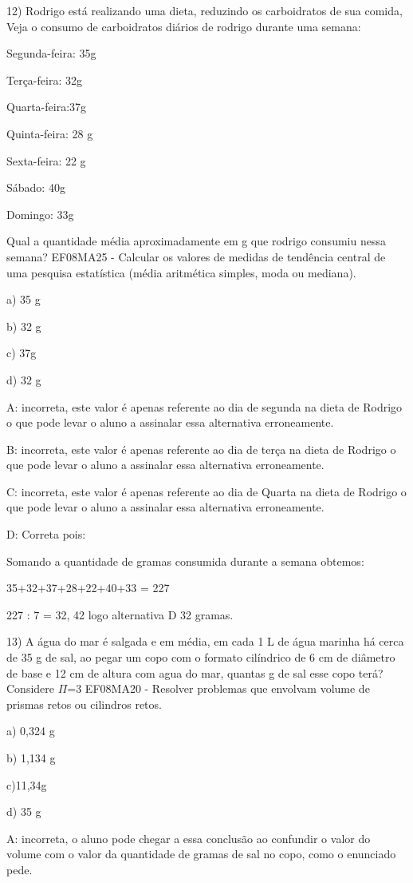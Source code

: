 {12) Rodrigo está realizando uma dieta, reduzindo os carboidratos de sua
comida, Veja o consumo de carboidratos diários de rodrigo durante uma
semana:

Segunda-feira: 35g

Terça-feira: 32g

Quarta-feira:37g

Quinta-feira: 28 g

Sexta-feira: 22 g

Sábado: 40g

Domingo: 33g

Qual a quantidade média aproximadamente em g que rodrigo consumiu nessa
semana? EF08MA25 - Calcular os valores de medidas de tendência central
de uma pesquisa estatística (média aritmética simples, moda ou mediana).

a) 35 g

b) 32 g

c) 37g

d) 32 g

A: incorreta, este valor é apenas referente ao dia de segunda na dieta
de Rodrigo o que pode levar o aluno a assinalar essa alternativa
erroneamente.

B: incorreta, este valor é apenas referente ao dia de terça na dieta de
Rodrigo o que pode levar o aluno a assinalar essa alternativa
erroneamente.

C: incorreta, este valor é apenas referente ao dia de Quarta na dieta de
Rodrigo o que pode levar o aluno a assinalar essa alternativa
erroneamente.

D: Correta pois:

Somando a quantidade de gramas consumida durante a semana obtemos:

35+32+37+28+22+40+33 = 227

227 : 7 = 32, 42 logo alternativa D 32 gramas.

13) A água do mar é salgada e em média, em cada 1 L de água marinha há
cerca de 35 g de sal, ao pegar um copo com o formato cilíndrico de 6 cm
de diâmetro de base e 12 cm de altura com agua do mar, quantas g de sal
esse copo terá? Considere \(\Pi\)=3 EF08MA20 - Resolver problemas que
envolvam volume de prismas retos ou cilindros retos.

a) 0,324 g

b) 1,134 g

c)11,34g

d) 35 g

A: incorreta, o aluno pode chegar a essa conclusão ao confundir o valor
do volume com o valor da quantidade de gramas de sal no copo, como o
enunciado pede.

}
